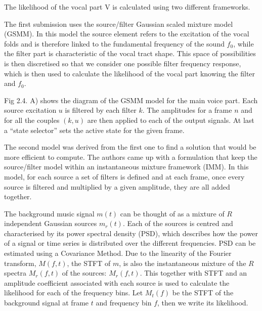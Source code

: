The likelihood of the vocal part V is calculated using two different frameworks. 

The first submission uses the source/filter Gaussian scaled mixture model (GSMM). In this model the source element refers to the excitation of the vocal folds and is therefore linked to the fundamental frequency of the sound $f_{\text{0}}$, while the filter part is characteristic of the vocal tract shape. This space of possibilities is then discretised so that we consider one possible filter frequency response, which is then used to calculate the likelihood of the vocal part knowing the filter and $f_{\text{0}}$.

Fig 2.4. A) shows the diagram of the GSMM model for the main voice part. Each source excitation $u$ is filtered by each filter $k$. The amplitudes for a frame $n$ and for all the couples $(k, u)$ are then applied to each of the output signals. At last a “state selector” sets the active state for the given frame.

The second model was derived from the first one to find a solution that would be more efficient to compute. The authors came up with a formulation that keep the source/filter model within an instantaneous mixture framework (IMM). In this model, for each source a set of filters is defined and at each frame, once every source is filtered and multiplied by a given amplitude, they are all added together.

The background music signal $m(t)$ can be thought of as a mixture of $R$ independent Gaussian sources $m_{r}(t)$. 
Each of the sources is centred and characterised by its power spectral density (PSD), which describes how the power of a signal or time series is distributed over the different frequencies. PSD can be estimated using a Covariance Method.
Due to the linearity of the Fourier transform, $M(f,t)$, the STFT of $m$, is also the instantaneous mixture of the $R$ spectra $M_{r}(f,t)$ of the sources: $M_{r}(f,t)$.
This together with STFT and an amplitude coefficient associated with each source is used to calculate the likelihood for each of the frequency bins. Let $M_{t}(f)$ be the STFT of the background signal at frame $t$ and frequency bin $f$, then we write its likelihood.


